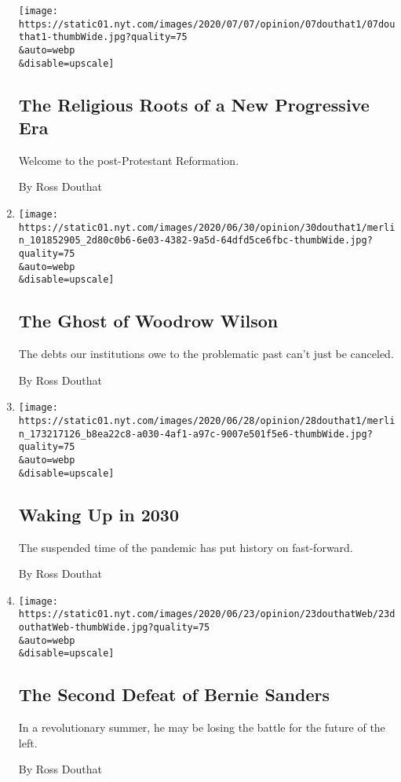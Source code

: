 \begin{enumerate}
  \texttt{[image: https://static01.nyt.com/images/2020/07/07/opinion/07douthat1/07douthat1-thumbWide.jpg?quality=75\\\&auto=webp\\\&disable=upscale]}

  \hypertarget{the-religious-roots-of-a-new-progressive-era}{%
  \subsection{The Religious Roots of a New Progressive
  Era}\label{the-religious-roots-of-a-new-progressive-era}}

  Welcome to the post-Protestant Reformation.

  By Ross Douthat
\item
  \href{/2020/06/30/opinion/woodrow-wilson-princeton.html}{}

  \texttt{[image: https://static01.nyt.com/images/2020/06/30/opinion/30douthat1/merlin\_101852905\_2d80c0b6-6e03-4382-9a5d-64dfd5ce6fbc-thumbWide.jpg?quality=75\\\&auto=webp\\\&disable=upscale]}

  \hypertarget{the-ghost-of-woodrow-wilson}{%
  \subsection{The Ghost of Woodrow
  Wilson}\label{the-ghost-of-woodrow-wilson}}

  The debts our institutions owe to the problematic past can't just be
  canceled.

  By Ross Douthat
\item
  \href{/2020/06/27/opinion/sunday/us-coronavirus-2030.html}{}

  \texttt{[image: https://static01.nyt.com/images/2020/06/28/opinion/28douthat1/merlin\_173217126\_b8ea22c8-a030-4af1-a97c-9007e501f5e6-thumbWide.jpg?quality=75\\\&auto=webp\\\&disable=upscale]}

  \hypertarget{waking-up-in-2030}{%
  \subsection{Waking Up in 2030}\label{waking-up-in-2030}}

  The suspended time of the pandemic has put history on fast-forward.

  By Ross Douthat
\item
  \href{/2020/06/23/opinion/bernie-sanders-protesters-democrats.html}{}

  \texttt{[image: https://static01.nyt.com/images/2020/06/23/opinion/23douthatWeb/23douthatWeb-thumbWide.jpg?quality=75\\\&auto=webp\\\&disable=upscale]}

  \hypertarget{the-second-defeat-of-bernie-sanders}{%
  \subsection{The Second Defeat of Bernie
  Sanders}\label{the-second-defeat-of-bernie-sanders}}

  In a revolutionary summer, he may be losing the battle for the future
  of the left.

  By Ross Douthat
\end{enumerate}

